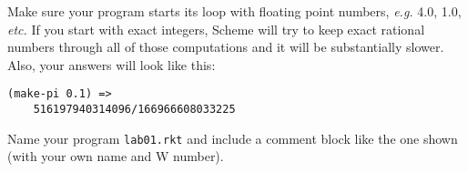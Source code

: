 \documentclass{article}
\begin{document}
\begin{multicols}{2}
\begin{description}
Make sure your program starts its loop with floating point numbers,
{\em e.g.} 4.0, 1.0, {\em etc.}  If you start with exact integers,
Scheme will try to keep exact rational numbers through all of those
computations and it will be substantially slower.  Also, your answers
will look like this:
\begin{Verbatim}[frame=single]
(make-pi 0.1) => 
    516197940314096/166966608033225
\end{Verbatim}

Name your program {\tt lab01.rkt} and include a comment block like the
one shown (with your own name and W number).


\end{description}
\end{multicols}
\end{document}
